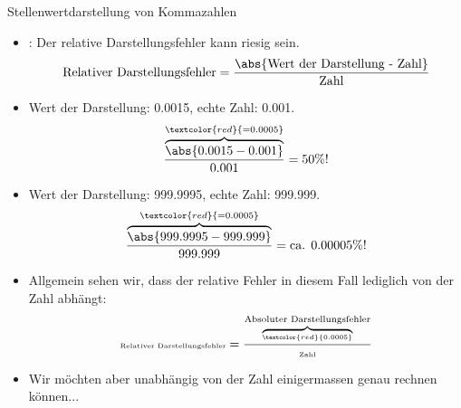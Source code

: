 \begin{frame}{Stellenwertdarstellung von Kommazahlen}

\begin{itemize}[<+->]
        \item {}: Der relative Darstellungsfehler kann riesig sein.
            \tiny$$
            \text{Relativer Darstellungsfehler} = \frac{\abs{\text{Wert der Darstellung - Zahl}}}{\text{Zahl}}
            $$
            \normalsize
        \item Wert der Darstellung: 0.0015, echte Zahl: 0.001.\\
        \tiny$$
        \frac{\overbrace{\abs{0.0015 - 0.001}}^{\textcolor{red}{=0.0005}}}{0.001} = \text{50\%!}
        $$
        \item Wert der Darstellung: 999.9995, echte Zahl: 999.999.\\
        \tiny$$
        \frac{\overbrace{\abs{999.9995 - 999.999}}^{\textcolor{red}{=0.0005}}}{999.999} = \text{ca. 0.00005\%!}
        $$\normalsize
        \item Allgemein sehen wir, dass der relative Fehler in diesem Fall lediglich von der Zahl abhängt:
        $$\tiny
                \text{Relativer Darstellungsfehler} = \frac{\overbrace{\textcolor{red}{0.0005}}^{\text{Absoluter Darstellungsfehler}}}{\text{Zahl}}
        \normalsize$$
        \item Wir möchten aber unabhängig von der Zahl einigermassen genau rechnen können...

\end{itemize}
\end{frame}


